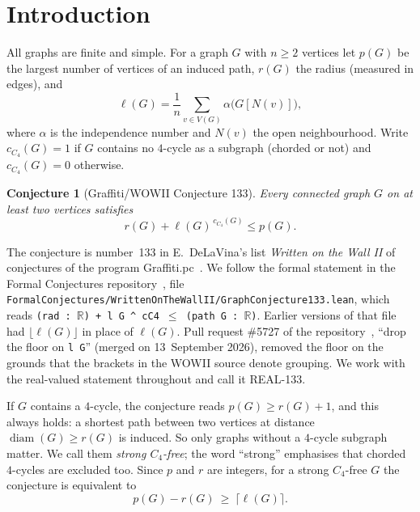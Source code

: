 \documentclass[11pt]{amsart}
\newtheorem{conjecture}[theorem]{Conjecture}
\theoremstyle{definition}
\theoremstyle{remark}
\newcommand{\lr}{\ell}
\newcommand{\pp}{p}
\begin{document}
\maketitle

\section{Introduction}

All graphs are finite and simple. For a graph $G$ with $n\ge2$ vertices let $\pp(G)$ be the largest number of vertices of an induced path, $r(G)$ the radius (measured in edges), and
\[
\lr(G)=\frac1n\sum_{v\in V(G)}\alpha\bigl(G[N(v)]\bigr),
\]
where $\alpha$ is the independence number and $N(v)$ the open neighbourhood. Write $c_{C_4}(G)=1$ if $G$ contains no $4$-cycle as a subgraph (chorded or not) and $c_{C_4}(G)=0$ otherwise.

\begin{conjecture}[Graffiti/WOWII Conjecture 133]\label{conj:133}
Every connected graph $G$ on at least two vertices satisfies
\[
r(G)+\lr(G)^{\,c_{C_4}(G)}\le \pp(G).
\]
\end{conjecture}

The conjecture is number~133 in E.~DeLaVina's list \emph{Written on the Wall II} of conjectures of the program Graffiti.pc~\cite{wowii}. We follow the formal statement in the Formal Conjectures repository~\cite{fc133}, file \texttt{FormalConjectures/WrittenOnTheWallII/GraphConjecture133.lean}, which reads \texttt{(rad : $\mathbb{R}$) + l G \^{} cC4 $\le$ (path G : $\mathbb{R}$)}. Earlier versions of that file had $\lfloor \lr(G)\rfloor$ in place of $\lr(G)$. Pull request \#5727 of the repository~\cite{fcpr}, ``drop the floor on \texttt{l G}'' (merged on 13~September 2026), removed the floor on the grounds that the brackets in the WOWII source denote grouping. We work with the real-valued statement throughout and call it REAL-133.

If $G$ contains a $4$-cycle, the conjecture reads $\pp(G)\ge r(G)+1$, and this always holds: a shortest path between two vertices at distance $\operatorname{diam}(G)\ge r(G)$ is induced. So only graphs without a $4$-cycle subgraph matter. We call them \emph{strong $C_4$-free}; the word ``strong'' emphasises that chorded $4$-cycles are excluded too. Since $\pp$ and $r$ are integers, for a strong $C_4$-free $G$ the conjecture is equivalent to
\begin{equation}\label{eq:target}
\pp(G)-r(G)\ \ge\ \lceil \lr(G)\rceil .
\end{equation}
\end{document}
